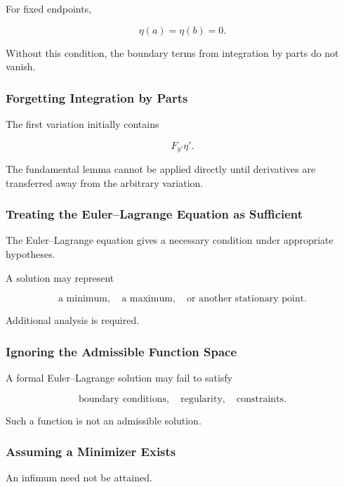 For fixed endpoints,

\[
\boxed{
\eta(a)=\eta(b)=0.
}
\]

Without this condition, the boundary terms from integration by parts do
not vanish.

\subsubsection{Forgetting Integration by Parts}

The first variation initially contains

\[
F_{y'}\eta'.
\]

The fundamental lemma cannot be applied directly until derivatives are
transferred away from the arbitrary variation.

\subsubsection{Treating the Euler--Lagrange Equation as Sufficient}

The Euler--Lagrange equation gives a necessary condition under appropriate
hypotheses.

A solution may represent

\[
\boxed{
\text{a minimum},
\quad
\text{a maximum},
\quad
\text{or another stationary point}.
}
\]

Additional analysis is required.

\subsubsection{Ignoring the Admissible Function Space}

A formal Euler--Lagrange solution may fail to satisfy

\[
\boxed{
\text{boundary conditions},
\quad
\text{regularity},
\quad
\text{constraints}.
}
\]

Such a function is not an admissible solution.

\subsubsection{Assuming a Minimizer Exists}

An infimum need not be attained.

